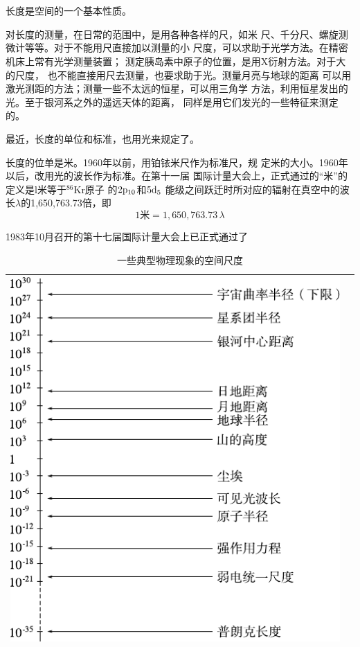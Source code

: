 \section[长度]{}\label{sec:01.03}

长度是空间的一个基本性质。

对长度的测量，在日常的范围中，是用各种各样的尺，如米
尺、千分尺、螺旋测微计等等。对于不能用尺直接加以测量的小
尺度，可以求助于光学方法。在精密机床上常有光学测量装置；
测定胰岛素中原子的位置，是用X衍射方法。对于大的尺度，
也不能直接用尺去测量，也要求助于光。测量月亮与地球的距离
可以用激光测距的方法；测量一些不太远的恒星，可以用三角学
方法，利用恒星发出的光。至于银河系之外的遥远天体的距离，
同样是用它们发光的一些特征来测定的。

最近，长度的单位和标准，也用光来规定了。

长度的位单是米。1960年以前，用铂铱米尺作为标准尺，规
定米的大小。1960年以后，改用光的波长作为标准。在第十一届
国际计量大会上，正式通过的“米”的定义是l米等于$^{86}$Kr原子
\clearpage\noindent
的$2\rm{p}_{10}$和$5\rm{d}_5$
能级之间跃迁时所对应的辐射在真空中的波长$\lambda$的1,650,763.73倍，即
\begin{equation*}
  1 \text{米} = 1,650,763.73 \, \lambda
\end{equation*}

1983年10月召开的第十七届国际计量大会上已正式通过了
\begin{table}[!h]
  \centering
  \caption{一些典型物理现象的空间尺度}
  \label{tab:01.03}
  \begin{tabular*}{\linewidth}{>{\centering}m{\linewidth}c}
    \toprule
    \includegraphics[width=0.8\linewidth]{figure/tab01.03} & \\
    \bottomrule
  \end{tabular*}
\end{table}
\clearpage

